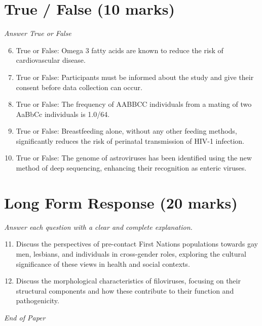 \documentclass[12pt]{article}
\begin{document}
\section*{True / False (10 marks)}
\textit{Answer True or False}
\begin{enumerate}[label=\arabic*.]
\setcounter{enumi}{5}
\item True or False: Omega 3 fatty acids are known to reduce the risk of cardiovascular disease.
\item True or False: Participants must be informed about the study and give their consent before data collection can occur.
\item True or False: The frequency of AABBCC individuals from a mating of two AaBbCc individuals is 1.0/64.
\item True or False: Breastfeeding alone, without any other feeding methods, significantly reduces the risk of perinatal transmission of HIV-1 infection.
\item True or False: The genome of astroviruses has been identified using the new method of deep sequencing, enhancing their recognition as enteric viruses.
\end{enumerate}

\section*{Long Form Response (20 marks)}
\textit{Answer each question with a clear and complete explanation.}
\begin{enumerate}[label=\arabic*.]
\setcounter{enumi}{10}
\item Discuss the perspectives of pre-contact First Nations populations towards gay men, lesbians, and individuals in cross-gender roles, exploring the cultural significance of these views in health and social contexts.
\item Discuss the morphological characteristics of filoviruses, focusing on their structural components and how these contribute to their function and pathogenicity.
\end{enumerate}

\vfill
\noindent\textit{End of Paper}
\end{document}
